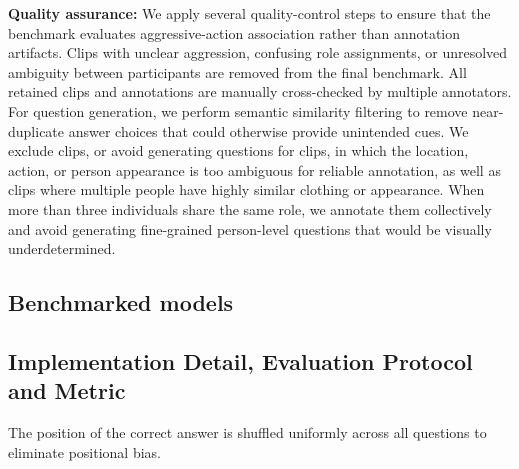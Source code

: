 \textbf{Quality assurance:}
We apply several quality-control steps to ensure that the benchmark evaluates aggressive-action association rather than annotation artifacts. Clips with unclear aggression, confusing role assignments, or unresolved ambiguity between participants are removed from the final benchmark. All retained clips and annotations are manually cross-checked by multiple annotators. For question generation, we perform semantic similarity filtering to remove near-duplicate answer choices that could otherwise provide unintended cues. We exclude clips, or avoid generating questions for clips, in which the location, action, or person appearance is too ambiguous for reliable annotation, as well as clips where multiple people have highly similar clothing or appearance. When more than three individuals share the same role, we annotate them collectively and avoid generating fine-grained person-level questions that would be visually underdetermined.

\subsection{Benchmarked models}


\subsection{Implementation Detail, Evaluation Protocol and Metric}
The position of the correct answer is shuffled uniformly across all questions to eliminate positional bias.